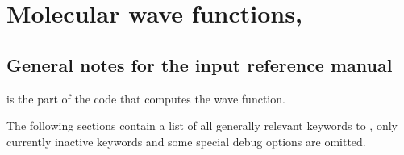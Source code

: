 \chapter{\label{chap:inpref} Molecular wave functions, {\sir}}

\section{\label{sec:ref-notes} General notes for the {\sir} input reference
manual}

{\sir} is the part of the code that computes the wave function.

The following sections contain a list of all generally relevant keywords to
{\sir}, only currently inactive keywords and some special debug
options are omitted.

